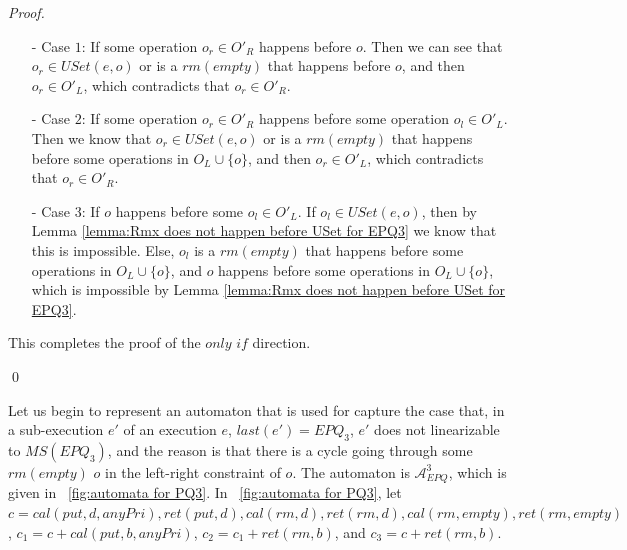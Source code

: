 \begin {proof}
\begin{itemize}
\setlength{\itemsep}{0.5pt}
\item[-] Case $1$: If some operation $o_r \in O'_R$ happens before $o$. Then we can see that $o_r \in \textit{USet}(e,o)$ or is a $\textit{rm}(\textit{empty})$ that happens before $o$, and then $o_r \in O'_L$, which contradicts that $o_r \in O'_R$.

\item[-] Case $2$: If some operation $o_r \in O'_R$ happens before some operation $o_l \in O'_L$. Then we know that $o_r \in \textit{USet}(e,o)$ or is a $\textit{rm}(\textit{empty})$ that happens before some operations in $O_L \cup \{ o \}$, and then $o_r \in O'_L$, which contradicts that $o_r \in O'_R$.

\item[-] Case $3$: If $o$ happens before some $o_l \in O'_L$. If $o_l \in \textit{USet}(e,o)$, then by Lemma \ref{lemma:Rmx does not happen before USet for EPQ3} we know that this is impossible. Else, $o_l$ is a $\textit{rm}(\textit{empty})$ that happens before some operations in $O_L \cup \{ o \}$, and $o$ happens before some operations in $O_L \cup \{ o \}$, which is impossible by Lemma \ref{lemma:Rmx does not happen before USet for EPQ3}.
\end{itemize}

This completes the proof of the $\textit{only if}$ direction.

\qed
\end {proof}

Let us begin to represent an automaton that is used for capture the case that, in a sub-execution $e'$ of an execution $e$, $\textit{last}(e')=\textit{EPQ}_3$, $e'$ does not linearizable to $\textit{MS}(\textit{EPQ}_3)$, and the reason is that there is a cycle going through some $\textit{rm}(\textit{empty})$ $o$ in the left-right constraint of $o$. The automaton is $\mathcal{A}_{\textit{EPQ}}^3$, which is given in \figurename~\ref{fig:automata for PQ3}. In \figurename~\ref{fig:automata for PQ3}, let $c = \textit{cal}(\textit{put},d,\textit{anyPri}),\textit{ret}(\textit{put},d), \textit{cal}(\textit{rm},d), \textit{ret}(\textit{rm},d),\textit{cal}(\textit{rm},\textit{empty}),\textit{ret}(\textit{rm},\textit{empty})$, $c_1 = c + \textit{cal}(\textit{put},b,\textit{anyPri})$, $c_2 = c_1 + \textit{ret}(\textit{rm},b)$, and $c_3 = c + \textit{ret}(\textit{rm},b)$.

